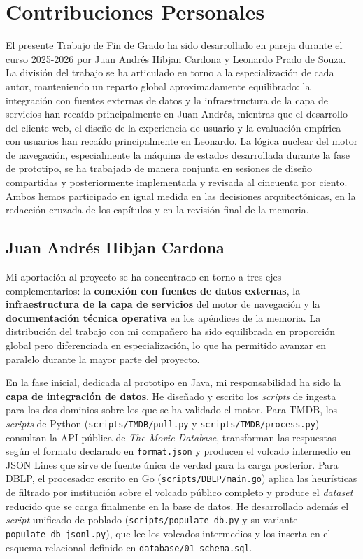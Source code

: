 \chapter*{Contribuciones Personales}
\label{cap:contribucionesPersonales}

El presente Trabajo de Fin de Grado ha sido desarrollado en pareja durante el curso 2025-2026
por Juan Andrés Hibjan Cardona y Leonardo Prado de Souza. La división del trabajo se ha
articulado en torno a la especialización de cada autor, manteniendo un reparto global
aproximadamente equilibrado: la integración con fuentes externas de datos y la infraestructura
de la capa de servicios han recaído principalmente en Juan Andrés, mientras que el desarrollo
del cliente web, el diseño de la experiencia de usuario y la evaluación empírica con usuarios
han recaído principalmente en Leonardo. La lógica nuclear del motor de navegación,
especialmente la máquina de estados desarrollada durante la fase de prototipo, se ha trabajado
de manera conjunta en sesiones de diseño compartidas y posteriormente implementada y revisada
al cincuenta por ciento. Ambos hemos participado en igual medida en las decisiones
arquitectónicas, en la redacción cruzada de los capítulos y en la revisión final de la memoria.

\section*{Juan Andrés Hibjan Cardona}

Mi aportación al proyecto se ha concentrado en torno a tres ejes complementarios: la
\textbf{conexión con fuentes de datos externas}, la \textbf{infraestructura de la capa de
servicios} del motor de navegación y la \textbf{documentación técnica operativa} en los
apéndices de la memoria. La distribución del trabajo con mi compañero ha sido equilibrada en
proporción global pero diferenciada en especialización, lo que ha permitido avanzar en paralelo
durante la mayor parte del proyecto.

En la fase inicial, dedicada al prototipo en Java, mi responsabilidad ha sido la \textbf{capa
de integración de datos}. He diseñado y escrito los \textit{scripts} de ingesta para los dos
dominios sobre los que se ha validado el motor. Para TMDB, los \textit{scripts} de Python
(\texttt{scripts/TMDB/pull.py} y \texttt{scripts/TMDB/process.py}) consultan la API pública de
\textit{The Movie Database}, transforman las respuestas según el formato declarado en
\texttt{format.json} y producen el volcado intermedio en JSON Lines que sirve de fuente única
de verdad para la carga posterior. Para DBLP, el procesador escrito en Go
(\texttt{scripts/DBLP/main.go}) aplica las heurísticas de filtrado por institución sobre el
volcado público completo y produce el \textit{dataset} reducido que se carga finalmente en la base de
datos. He desarrollado además el \textit{script} unificado de poblado
(\texttt{scripts/populate\_db.py} y su variante \texttt{populate\_db\_jsonl.py}), que lee los
volcados intermedios y los inserta en el esquema relacional definido en
\texttt{database/01\_schema.sql}.

